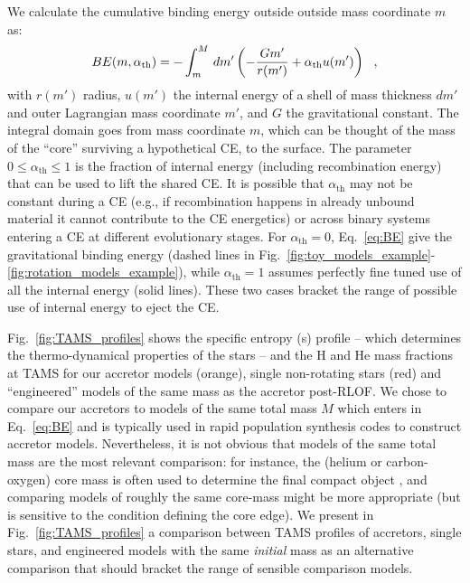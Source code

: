 \documentclass[twocolumn,twocolappendix,trackchanges]{aastex63}
\DeclareRobustCommand{\Eqref}[1]{Eq.~\ref{#1}}
\DeclareRobustCommand{\Figref}[1]{Fig.~\ref{#1}}
\begin{document}
We calculate the cumulative binding energy outside outside mass coordinate $m$
\citep[e.g.,][]{dekool:1990, dewi:2000, lau:2022} as:
\begin{equation}
  \label{eq:BE}
BE(m, \alpha_{\rm th}) = - \int_{m}^M\,dm'\left( -\frac{G m'}{r(m')}+\alpha_\mathrm{th} u(m')\right) \ \ ,
\end{equation}
with $r(m')$ radius, $u(m')$ the internal energy of a shell of mass
thickness $dm'$ and outer Lagrangian mass coordinate $m'$, and $G$ the
gravitational constant. The integral domain goes from mass coordinate
$m$, which can be thought of the mass of the ``core'' surviving a
hypothetical CE, to the surface. The parameter
$0\leq \alpha_\mathrm{th}\leq 1$ is the fraction of internal energy
(including recombination energy) that can be used to lift the shared
CE. It is possible that $\alpha_\mathrm{th}$ may not be constant
during a CE (e.g., if recombination happens in already unbound
material it cannot contribute to the CE energetics) or across binary
systems entering a CE at different evolutionary stages. For
$\alpha_\mathrm{th}=0$, \Eqref{eq:BE} give the gravitational binding
energy (dashed lines in
\Figref{fig:toy_models_example}-\ref{fig:rotation_models_example}),
while $\alpha_{\mathrm{th}}=1$ assumes perfectly fine tuned use of all
the internal energy (solid lines). These two cases bracket the range
of possible use of internal energy to eject the CE.

\Figref{fig:TAMS_profiles} shows the specific entropy (s) profile --
which determines the thermo-dynamical properties of the stars -- and the
H and He mass fractions at TAMS for our accretor models (orange),
single non-rotating stars (red) and ``engineered'' models of the same
mass as the accretor post-RLOF. We chose to compare our accretors to
models of the same total mass $M$ which enters in \Eqref{eq:BE} and is
typically used in rapid population synthesis codes to construct
accretor models. Nevertheless, it is not obvious that models of the
same total mass are the most relevant comparison: for instance, the
(helium or carbon-oxygen) core mass is often used to determine the
final compact object \citep[e.g.,][]{fryer:2012, farmer:2019,
  patton:2021, renzo:2022, fryer:2022}, and comparing models of
roughly the same core-mass might be more appropriate (but is sensitive
to the condition defining the core edge). We present in
\Figref{fig:TAMS_profiles} a comparison between TAMS profiles of
accretors, single stars, and engineered models with the same
\emph{initial} mass as an alternative comparison that should bracket
the range of sensible comparison models.
\end{document}
